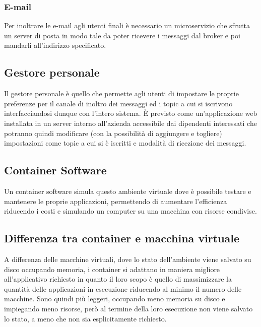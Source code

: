 		\subsubsection{E-mail}
		Per inoltrare le e-mail agli utenti finali è necessario un microservizio che sfrutta un server di posta in modo tale da poter ricevere i messaggi dal broker e poi mandarli all'indirizzo specificato.
		
	
	\subsection{Gestore personale}
	Il gestore personale è quello che permette agli utenti di impostare le proprie preferenze per il canale di inoltro dei messaggi ed i topic a cui si iscrivono interfacciandosi dunque con l'intero sistema.
	È previsto come un'applicazione web installata in un server interno all'azienda accessibile dai dipendenti interessati che potranno quindi modificare (con la possibilità di aggiungere e togliere) impostazioni come topic a cui si è iscritti e modalità di ricezione dei messaggi.
	
	\subsection{Container Software}
	
		Un container software simula questo ambiente virtuale dove è possibile testare e mantenere le proprie applicazioni, permettendo di aumentare l'efficienza riducendo i costi e simulando un computer su una macchina con risorse condivise.
		
		\subsection{Differenza tra container e macchina virtuale}
		A differenza delle macchine virtuali, dove lo stato dell'ambiente viene salvato su disco occupando memoria, i container si adattano in maniera migliore all'applicativo richiesto in quanto il loro scopo è quello di massimizzare la quantità delle applicazioni in esecuzione riducendo al minimo il numero delle macchine.
		Sono quindi più leggeri, occupando meno memoria su disco e impiegando meno risorse, però al termine della loro esecuzione non viene salvato lo stato, a meno che non sia esplicitamente richiesto.
		
